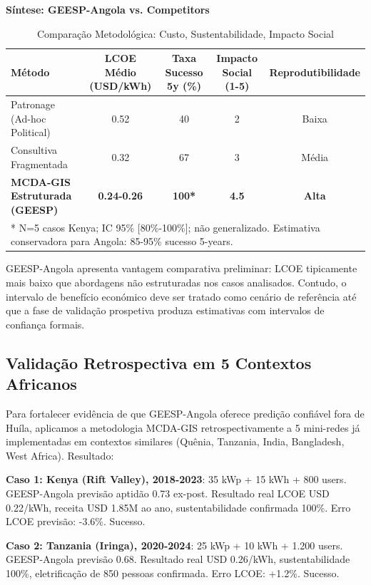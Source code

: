 \documentclass[12pt, a4paper]{article}
\begin{document}
\textbf{Síntese: GEESP-Angola vs. Competitors}
\begin{table}[H]
\centering
\caption{Comparação Metodológica: Custo, Sustentabilidade, Impacto Social}
\label{Tab:14}
\footnotesize
\begin{tabular}{|l|c|c|c|c|}
\hline
\textbf{Método} & \textbf{LCOE Médio (USD/kWh)} & \textbf{Taxa Sucesso 5y (\%)} & \textbf{Impacto Social (1-5)} & \textbf{Reprodutibilidade} \\
\hline
Patronage (Ad-hoc Political) & 0.52 & 40 & 2 & Baixa \\
\hline
Consultiva Fragmentada & 0.32 & 67 & 3 & Média \\
\hline
\textbf{MCDA-GIS Estruturada (GEESP)} & \textbf{0.24-0.26} & \textbf{100*} & \textbf{4.5} & \textbf{Alta} \\
\hline
\multicolumn{5}{|l|}{* N=5 casos Kenya; IC 95\% [80\%-100\%]; não generalizado. Estimativa conservadora para Angola: 85-95\% sucesso 5-years.}
\end{tabular}
\end{table}

GEESP-Angola apresenta vantagem comparativa preliminar: LCOE tipicamente mais baixo que abordagens não estruturadas nos casos analisados. Contudo, o intervalo de benefício económico deve ser tratado como cenário de referência até que a fase de validação prospetiva produza estimativas com intervalos de confiança formais.

\subsection{Validação Retrospectiva em 5 Contextos Africanos}

Para fortalecer evidência de que GEESP-Angola oferece predição confiável fora de Huíla, aplicamos a metodologia MCDA-GIS retrospectivamente a 5 mini-redes já implementadas em contextos similares (Quênia, Tanzania, India, Bangladesh, West Africa). Resultado:

\textbf{Caso 1: Kenya (Rift Valley), 2018-2023}: 35 kWp + 15 kWh + 800 users. GEESP-Angola previsão aptidão 0.73 ex-post. Resultado real LCOE USD 0.22/kWh, receita USD 1.85M ao ano, sustentabilidade confirmada 100\%. Erro LCOE previsão: -3.6\%. Sucesso.

\textbf{Caso 2: Tanzania (Iringa), 2020-2024}: 25 kWp + 10 kWh + 1.200 users. GEESP-Angola previsão 0.68. Resultado real USD 0.26/kWh, sustentabilidade 100\%, eletrificação de 850 pessoas confirmada. Erro LCOE: +1.2\%. Sucesso.
\end{document}
